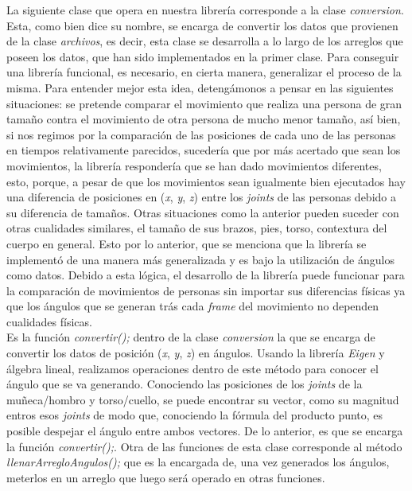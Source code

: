 \documentclass[letterpaper]{article}
\begin{document}
\quad \quad La siguiente clase que opera en nuestra librería corresponde a la clase \textit{conversion}. Esta, como bien dice su nombre, se encarga de convertir los datos que provienen de la clase \textit{archivos}, es decir, esta clase se desarrolla a lo largo
de los arreglos que poseen los datos, que han sido implementados en la primer clase. Para conseguir una librería funcional, es necesario, en cierta manera, generalizar el proceso de la misma. Para entender mejor esta idea, detengámonos a pensar en las siguientes situaciones:
se pretende comparar el movimiento que realiza una persona de gran tamaño contra el movimiento de otra persona de mucho menor tamaño, así bien, si nos regimos por la comparación de las posiciones de cada uno de las personas en tiempos relativamente parecidos, sucedería que por más acertado
que sean los movimientos, la librería respondería que se han dado movimientos diferentes, esto, porque, a pesar de que los movimientos sean igualmente bien ejecutados hay una diferencia de posiciones en (\textit{x}, \textit{y}, \textit{z}) entre los \textit{joints} de las personas debido a su diferencia de tamaños.
Otras situaciones como la anterior pueden suceder con otras cualidades similares, el tamaño de sus brazos, pies, torso, contextura del cuerpo en general. Esto por lo anterior, que se menciona que la librería se implementó de una manera más generalizada y es bajo la utilización de ángulos como datos. Debido a esta lógica,
el desarrollo de la librería puede funcionar para la comparación de movimientos de personas sin importar sus diferencias físicas ya que los ángulos que se generan trás cada \textit{frame} del movimiento no dependen cualidades físicas.\\

Es la función \textit{convertir();} dentro de la clase \textit{conversion} la que se encarga de convertir los datos de posición (\textit{x}, \textit{y}, \textit{z}) en ángulos. Usando la librería \textit{Eigen} y álgebra lineal, realizamos operaciones dentro
de este método para conocer el ángulo que se va generando. Conociendo las posiciones de los \textit{joints} de la muñeca/hombro y torso/cuello, se puede encontrar su vector, como su magnitud entros esos \textit{joints} de modo que, conociendo la fórmula del producto punto, es posible despejar el ángulo entre ambos vectores.
De lo anterior, es que se encarga la función \textit{convertir();}. Otra de las funciones de esta clase corresponde al método \textit{llenarArregloAngulos();} que es la encargada de, una vez generados los ángulos, meterlos en un arreglo que luego será operado en otras funciones. 
\end{document}
